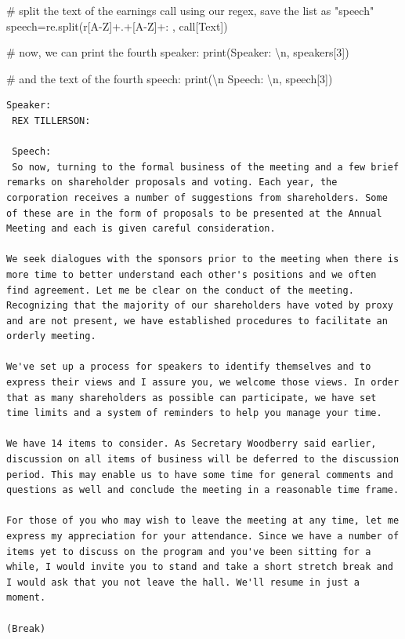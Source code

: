 \documentclass[
  letterpaper,
  DIV=11,
  numbers=noendperiod]{scrreprt}
\newenvironment{Shaded}{\begin{snugshade}}{\end{snugshade}}
\newcommand{\BuiltInTok}[1]{\textcolor[rgb]{0.00,0.23,0.31}{#1}}
\newcommand{\CharTok}[1]{\textcolor[rgb]{0.13,0.47,0.30}{#1}}
\newcommand{\CommentTok}[1]{\textcolor[rgb]{0.37,0.37,0.37}{#1}}
\newcommand{\DecValTok}[1]{\textcolor[rgb]{0.68,0.00,0.00}{#1}}
\newcommand{\NormalTok}[1]{\textcolor[rgb]{0.00,0.23,0.31}{#1}}
\newcommand{\OperatorTok}[1]{\textcolor[rgb]{0.37,0.37,0.37}{#1}}
\newcommand{\StringTok}[1]{\textcolor[rgb]{0.13,0.47,0.30}{#1}}
\newcommand{\VerbatimStringTok}[1]{\textcolor[rgb]{0.13,0.47,0.30}{#1}}
\begin{document}
\begin{Shaded}
\begin{Highlighting}[]
\CommentTok{\# split the text of the earnings call using our regex, save the list as "speech"}
\NormalTok{speech}\OperatorTok{=}\NormalTok{re.split(}\VerbatimStringTok{r\textquotesingle{}[A{-}Z]+.+[A{-}Z]+: \textquotesingle{}}\NormalTok{, call[}\StringTok{\textquotesingle{}Text\textquotesingle{}}\NormalTok{])}

\CommentTok{\# now, we can print the fourth speaker:}
\BuiltInTok{print}\NormalTok{(}\StringTok{\textquotesingle{}Speaker: }\CharTok{\textbackslash{}n}\StringTok{\textquotesingle{}}\NormalTok{, speakers[}\DecValTok{3}\NormalTok{])}
 
\CommentTok{\# and the text of the fourth speech:  }
\BuiltInTok{print}\NormalTok{(}\StringTok{\textquotesingle{}}\CharTok{\textbackslash{}n}\StringTok{ Speech: }\CharTok{\textbackslash{}n}\StringTok{\textquotesingle{}}\NormalTok{, speech[}\DecValTok{3}\NormalTok{])}
\end{Highlighting}
\end{Shaded}

\begin{verbatim}
Speaker: 
 REX TILLERSON: 

 Speech: 
 So now, turning to the formal business of the meeting and a few brief remarks on shareholder proposals and voting. Each year, the corporation receives a number of suggestions from shareholders. Some of these are in the form of proposals to be presented at the Annual Meeting and each is given careful consideration.

We seek dialogues with the sponsors prior to the meeting when there is more time to better understand each other's positions and we often find agreement. Let me be clear on the conduct of the meeting. Recognizing that the majority of our shareholders have voted by proxy and are not present, we have established procedures to facilitate an orderly meeting.

We've set up a process for speakers to identify themselves and to express their views and I assure you, we welcome those views. In order that as many shareholders as possible can participate, we have set time limits and a system of reminders to help you manage your time.

We have 14 items to consider. As Secretary Woodberry said earlier, discussion on all items of business will be deferred to the discussion period. This may enable us to have some time for general comments and questions as well and conclude the meeting in a reasonable time frame.

For those of you who may wish to leave the meeting at any time, let me express my appreciation for your attendance. Since we have a number of items yet to discuss on the program and you've been sitting for a while, I would invite you to stand and take a short stretch break and I would ask that you not leave the hall. We'll resume in just a moment.

(Break)

\end{verbatim}
\end{document}

